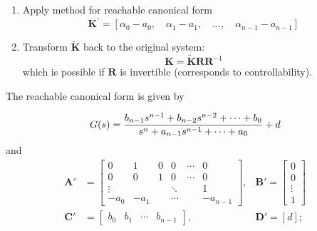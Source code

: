 \begin{enumerate}
    \item Apply method for reachable canonical form
          \begin{equation*}
              \mathbf{K}^{\prime} =\left[\alpha_{0}-a_{0},\quad\alpha_{1}-a_{1},\quad\ldots,\quad\alpha_{n-1}-a_{n-1}\right]
          \end{equation*}
    \item Transform $\tilde{\mathbf{K}}$ back to the original system:
          \noindent\begin{equation*}
              \mathbf{K}          = \tilde{\mathbf{K}}\mathbf{RR}^{-1}
          \end{equation*}
          which is possible if $\mathbf{R}$ is invertible (corresponds to controllability).
\end{enumerate}

\newpar{}
\label{RCF}

The reachable canonical form is given by

\begin{equation*}
    G(s)=\frac{b_{n-1}s^{n-1}+b_{n-2}s^{n-2}+\cdots+b_0}{s^n+a_{n-1}s^{n-1}+\cdots+a_0}+d\\
\end{equation*}
and
\begin{align*}
    \mathbf{A}' & =\begin{bmatrix}
                       0      & 1    & 0 & 0      & \cdots & 0        \\
                       0      & 0    & 1 & 0      & \cdots & 0        \\
                       \vdots &      &   & \ddots &        & 1        \\
                       -a_0   & -a_1 &   & \cdots &        & -a_{n-1}
                   \end{bmatrix}, & \mathbf{B}' =\begin{bmatrix}
                                                     0      \\
                                                     0      \\
                                                     \vdots \\
                                                     1\end{bmatrix}                             \\
    \mathbf{C}' & =\begin{bmatrix}
                       b_0 & b_1 & \cdots & b_{n-1}
                   \end{bmatrix},                     & \mathbf{D}'                     =[d];
\end{align*}

